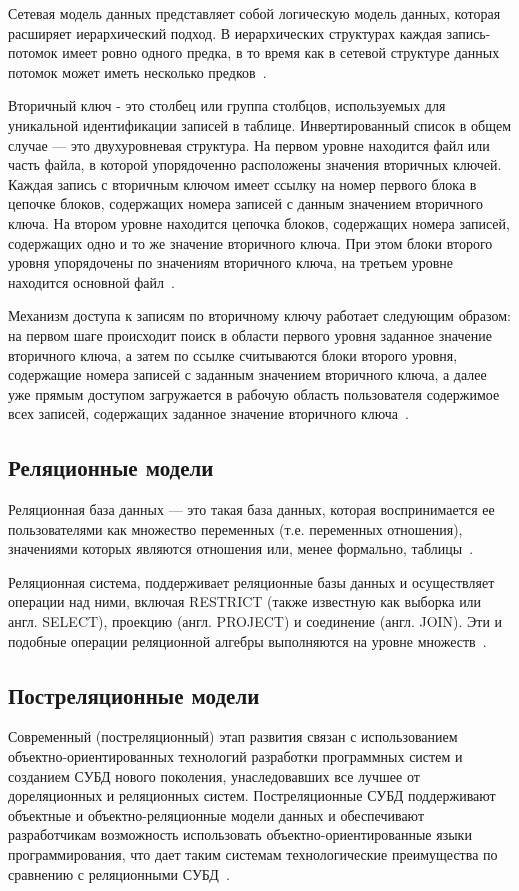 Сетевая модель данных представляет собой логическую модель данных, которая расширяет иерархический подход. В иерархических структурах каждая запись-потомок имеет ровно одного предка, в то время как в сетевой структуре данных потомок может иметь несколько предков~\cite{wolf-db}.

Вторичный ключ - это столбец или группа столбцов, используемых для уникальной идентификации записей в таблице.
Инвертированный список в общем случае --- это двухуровневая структура. На первом уровне находится файл или часть файла, в которой упорядоченно расположены значения вторичных ключей. Каждая запись с вторичным ключом имеет ссылку на номер первого блока в цепочке блоков, содержащих номера записей с данным значением вторичного ключа. На втором уровне находится цепочка блоков, содержащих номера записей, содержащих одно и то же значение вторичного ключа. При этом блоки второго уровня упорядочены по значениям вторичного ключа, на третьем уровне находится основной файл~\cite{inverted-lists}.

Механизм доступа к записям по вторичному ключу работает следующим образом: на первом шаге происходит поиск в области первого уровня заданное значение вторичного ключа, а затем по ссылке считываются блоки второго уровня, содержащие номера записей с заданным значением вторичного ключа, а далее уже прямым доступом загружается в рабочую область пользователя содержимое всех записей, содержащих заданное значение вторичного ключа~\cite{inverted-lists}.


\subsection{Реляционные модели}
Реляционная база данных — это такая база данных, которая воспринимается ее пользователями как множество переменных (т.е. переменных отношения), значениями которых являются отношения или, менее формально, таблицы~\cite{williams-db}.

Реляционная система, поддерживает реляционные базы данных и осуществляет операции над ними, включая RESTRICT (также известную как выборка или англ. SELECT), проекцию (англ. PROJECT) и соединение (англ. JOIN). Эти и подобные операции реляционной алгебры выполняются на уровне множеств~\cite{williams-db}.

\subsection{Постреляционные модели}
Современный (постреляционный) этап развития связан с использованием объектно-ориентированных технологий разработки программных систем и созданием СУБД нового поколения, унаследовавших все лучшее от дореляционных и реляционных систем. Постреляционные СУБД поддерживают 
объектные и объектно-реляционные модели данных и обеспечивают разработчикам возможность использовать объектно-ориентированные языки программирования, что дает таким системам технологические преимущества по сравнению с реляционными СУБД~\cite{wolf-db}.

